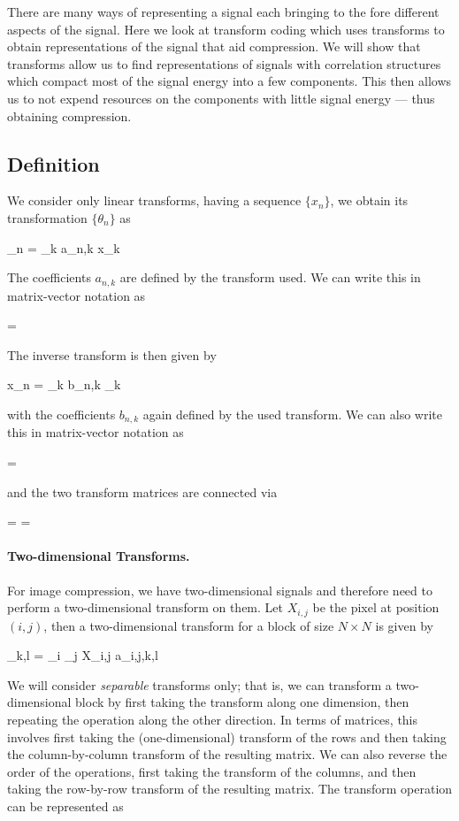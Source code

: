 
There are many ways of representing a signal each bringing to the fore different aspects of the signal. Here we look at transform coding which uses transforms to obtain representations of the signal that aid compression. We will show that transforms allow us to find representations of signals with correlation structures which compact most of the signal energy into a few components. This then allows us to not expend resources on the components with little signal energy — thus obtaining compression.


\subsection{Definition}

We consider only linear transforms, having a sequence $\{x_n\}$, we obtain its transformation $\{ \theta_n \}$ as

\bee
\theta_n = \sum_k a_{n,k} x_k
\eee


The coefficients $a_{n,k}$ are defined by the transform used. We can write this in matrix-vector notation as

\bee
\theta = \Abf \xbf
\eee

The inverse transform is then given by

\bee
x_n = \sum_k b_{n,k} \theta_k
\eee

with the coefficients $b_{n,k}$ again defined by the used transform. We can also write this in matrix-vector notation as

\bee
\xbf = \Bbf \theta
\eee

and the two transform matrices are connected via

\bee
\Abf \Bbf = \Bbf \Abf = \Ibf
\eee

\paragraph{Two-dimensional Transforms.} For image compression, we have two-dimensional signals and therefore need to perform a two-dimensional transform on them. Let $X_{i,j}$ be the pixel at position $(i,j)$, then a two-dimensional transform for a block of size $N \times N$ is given by

\bee
\theta_{k,l} = \sum_i \sum_j X_{i,j} a_{i,j,k,l}
\eee

We will consider \emph{separable} transforms only; that is, we can transform a two-dimensional block by first taking the transform along one dimension, then repeating the operation along the other direction. In terms of matrices, this involves first taking the (one-dimensional) transform of the rows and then taking the column-by-column transform of the resulting matrix. We can also reverse the order of the operations, first taking the transform of the columns, and then taking the row-by-row transform of the resulting matrix. The transform operation can be represented as


